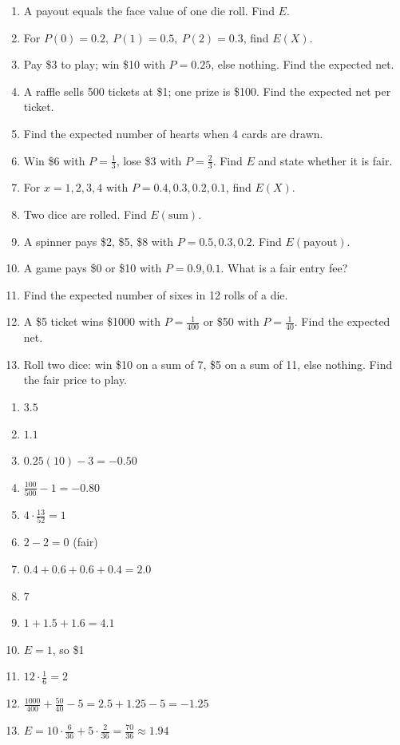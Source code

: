 \documentclass[11pt]{article}
\begin{document}
\clearpage
{}

\begin{recapbox}
\begin{multicols}{2}
\small
\begin{enumerate}[leftmargin=*,itemsep=3pt]
  \item A payout equals the face value of one die roll. Find $E$.
  \item For $P(0)=0.2,\ P(1)=0.5,\ P(2)=0.3$, find $E(X)$.
  \item Pay \$3 to play; win \$10 with $P=0.25$, else nothing. Find the expected net.
  \item A raffle sells 500 tickets at \$1; one prize is \$100. Find the expected net per ticket.
  \item Find the expected number of hearts when 4 cards are drawn.
  \item Win \$6 with $P=\tfrac13$, lose \$3 with $P=\tfrac23$. Find $E$ and state whether it is fair.
  \item For $x=1,2,3,4$ with $P=0.4,0.3,0.2,0.1$, find $E(X)$.
  \item Two dice are rolled. Find $E(\text{sum})$.
  \item A spinner pays \$2, \$5, \$8 with $P=0.5,0.3,0.2$. Find $E(\text{payout})$.
  \item A game pays \$0 or \$10 with $P=0.9,0.1$. What is a fair entry fee?
  \item Find the expected number of sixes in 12 rolls of a die.
  \item A \$5 ticket wins \$1000 with $P=\tfrac{1}{400}$ or \$50 with $P=\tfrac{1}{40}$. Find the expected net.
  \item Roll two dice: win \$10 on a sum of 7, \$5 on a sum of 11, else nothing. Find the fair price to play.
\end{enumerate}
\end{multicols}
\end{recapbox}

\begin{keybox}
\begin{multicols}{2}
\small
\begin{enumerate}[leftmargin=*,itemsep=3pt]
  \item $3.5$
  \item $1.1$
  \item $0.25(10)-3=-0.50$
  \item $\tfrac{100}{500}-1=-0.80$
  \item $4\cdot\tfrac{13}{52}=1$
  \item $2-2=0$ (fair)
  \item $0.4+0.6+0.6+0.4=2.0$
  \item $7$
  \item $1+1.5+1.6=4.1$
  \item $E=1$, so \$1
  \item $12\cdot\tfrac16=2$
  \item $\tfrac{1000}{400}+\tfrac{50}{40}-5=2.5+1.25-5=-1.25$
  \item $E=10\cdot\tfrac{6}{36}+5\cdot\tfrac{2}{36}=\tfrac{70}{36}\approx1.94$
\end{enumerate}
\end{multicols}
\end{keybox}
\end{document}
